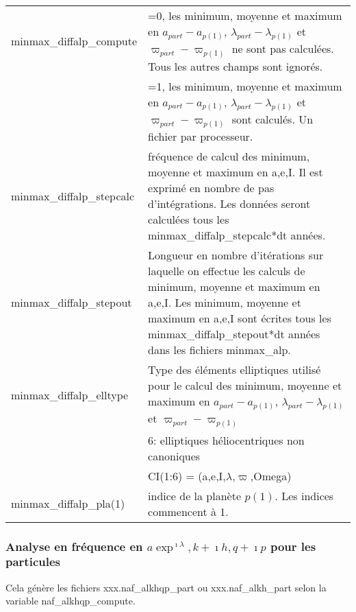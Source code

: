 \documentclass[11pt]{article}
\begin{document}
\begin{tabularx}{\textwidth}{|l|X|}
\hline
minmax\_diffalp\_compute  & =0, les minimum, moyenne et maximum en  $a_{part}-a_{p(1)}$, $\lambda_{part}-\lambda_{p(1)}$ et $\varpi_{part}-\varpi_{p(1)}$ ne sont pas calcul\'ees. Tous les autres champs sont ignor\'es.\\
&=1, les minimum, moyenne et maximum en  $a_{part}-a_{p(1)}$, $\lambda_{part}-\lambda_{p(1)}$ et $\varpi_{part}-\varpi_{p(1)}$ sont calcul\'es. Un fichier par processeur.\\ \hline
minmax\_diffalp\_stepcalc   & fr\'equence de calcul des minimum, moyenne et maximum en a,e,I. Il est exprim\'e en nombre de pas d'int\'egrations. Les donn\'ees seront calcul\'ees tous les minmax\_diffalp\_stepcalc*dt ann\'ees.\\ \hline

minmax\_diffalp\_stepout   &Longueur en nombre d'it\'erations sur laquelle on effectue les calculs de minimum, moyenne et maximum en a,e,I. Les minimum, moyenne et maximum en a,e,I sont \'ecrites tous les minmax\_diffalp\_stepout*dt ann\'ees dans les fichiers minmax\_alp. \\ \hline
minmax\_diffalp\_elltype  & Type des \'el\'ements elliptiques utilis\'e pour le calcul des  minimum, moyenne et maximum en $a_{part}-a_{p(1)}$, $\lambda_{part}-\lambda_{p(1)}$ et $\varpi_{part}-\varpi_{p(1)}$ \\
&6:  elliptiques h\'eliocentriques non canoniques\\
&	     CI(1:6) = (a,e,I,$\lambda$,$\varpi$,Omega)\\ \hline
minmax\_diffalp\_pla(1)   & indice de la plan\`ete $p(1)$. Les indices commencent \`a 1.\\ \hline
 \end{tabularx}

\vspace{0.5cm}
\subsubsection*{Analyse en fr\'equence en $a\exp^{\imath\lambda}, k+\imath h, q+\imath p$ pour les particules}
Cela g\'en\`ere les fichiers xxx.naf\_alkhqp\_part ou xxx.naf\_alkh\_part selon la variable naf\_alkhqp\_compute.
\end{document}
